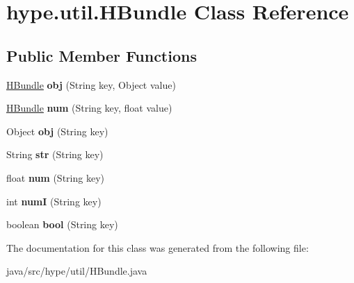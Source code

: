 \hypertarget{classhype_1_1util_1_1_h_bundle}{\section{hype.\-util.\-H\-Bundle Class Reference}
\label{classhype_1_1util_1_1_h_bundle}
}
\subsection*{Public Member Functions}
\begin{DoxyCompactItemize}
\item 
\hypertarget{classhype_1_1util_1_1_h_bundle_a98c6756d068540847ecbd27cd516fed7}{\hyperlink{classhype_1_1util_1_1_h_bundle}{H\-Bundle} {\bfseries obj} (String key, Object value)}\label{classhype_1_1util_1_1_h_bundle_a98c6756d068540847ecbd27cd516fed7}

\item 
\hypertarget{classhype_1_1util_1_1_h_bundle_a0dfbb17eba2677cae1caaed013b36ea6}{\hyperlink{classhype_1_1util_1_1_h_bundle}{H\-Bundle} {\bfseries num} (String key, float value)}\label{classhype_1_1util_1_1_h_bundle_a0dfbb17eba2677cae1caaed013b36ea6}

\item 
\hypertarget{classhype_1_1util_1_1_h_bundle_a188e58353d1b8804dffb24d9d9d1c13c}{Object {\bfseries obj} (String key)}\label{classhype_1_1util_1_1_h_bundle_a188e58353d1b8804dffb24d9d9d1c13c}

\item 
\hypertarget{classhype_1_1util_1_1_h_bundle_a80634b97b3eb742e8df4da4e8ef0ebfc}{String {\bfseries str} (String key)}\label{classhype_1_1util_1_1_h_bundle_a80634b97b3eb742e8df4da4e8ef0ebfc}

\item 
\hypertarget{classhype_1_1util_1_1_h_bundle_abc6fde0b241eb0bf81a19b1706c40d89}{float {\bfseries num} (String key)}\label{classhype_1_1util_1_1_h_bundle_abc6fde0b241eb0bf81a19b1706c40d89}

\item 
\hypertarget{classhype_1_1util_1_1_h_bundle_a0a9d3c38b42599b343222eff9d567388}{int {\bfseries num\-I} (String key)}\label{classhype_1_1util_1_1_h_bundle_a0a9d3c38b42599b343222eff9d567388}

\item 
\hypertarget{classhype_1_1util_1_1_h_bundle_aec9b498495c782a30c937e8cf0307cf7}{boolean {\bfseries bool} (String key)}\label{classhype_1_1util_1_1_h_bundle_aec9b498495c782a30c937e8cf0307cf7}

\end{DoxyCompactItemize}


The documentation for this class was generated from the following file\-:\begin{DoxyCompactItemize}
\item 
java/src/hype/util/H\-Bundle.\-java\end{DoxyCompactItemize}

